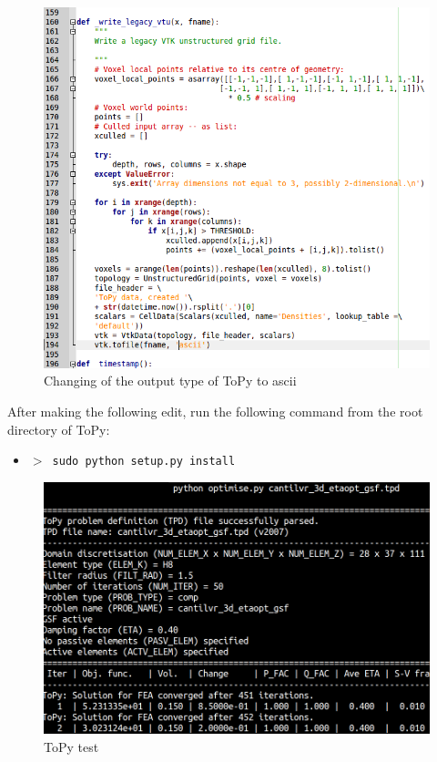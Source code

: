 \documentclass[
12pt, %
a4paper, %
oneside, %
headinclude,footinclude, %
BCOR5mm, %
]{scrartcl}
\begin{document}
\begin{figure}
\centering
\includegraphics[scale=0.5]{img/ToPy_CodeChange.png}
\caption{Changing of the output type of ToPy to ascii}
\label{fig:ToPy_CodeChange}
\end{figure}

After making the following edit, run the following command from the root directory of ToPy:
\begin{itemize}
\item[] \texttt{\textbf{$>$ }sudo python setup.py install}
\end{itemize}

\begin{figure}
\centering
\includegraphics[scale=0.3]{img/ToPy_ExampleRun_cut.png}
\caption{ToPy test}
\label{fig:ToPy_test}
\end{figure}
\end{document}
